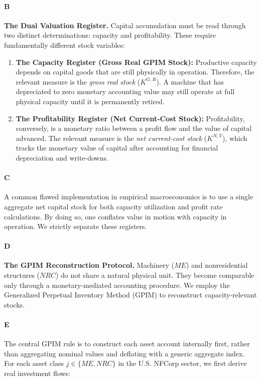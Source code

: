 \paragraph{B}
\textbf{The Dual Valuation Register.} Capital accumulation must be read through two distinct determinations: capacity and profitability. These require fundamentally different stock variables:

\begin{enumerate}
	\item \textbf{The Capacity Register (Gross Real GPIM Stock):} Productive capacity depends on capital goods that are still physically in operation. Therefore, the relevant measure is the \textit{gross real stock} ($K^{G,R}$). A machine that has depreciated to zero monetary accounting value may still operate at full physical capacity until it is permanently retired.
	\item \textbf{The Profitability Register (Net Current-Cost Stock):} Profitability, conversely, is a monetary ratio between a profit flow and the value of capital advanced. The relevant measure is the \textit{net current-cost stock} ($K^{N,V}$), which tracks the monetary value of capital after accounting for financial depreciation and write-downs.
\end{enumerate}

\paragraph{C}
A common flawed implementation in empirical macroeconomics is to use a single aggregate net capital stock for both capacity utilization and profit rate calculations. By doing so, one conflates value in motion with capacity in operation. We strictly separate these registers.

\paragraph{D}
\textbf{The GPIM Reconstruction Protocol.} Machinery ($ME$) and nonresidential structures ($NRC$) do not share a natural physical unit. They become comparable only through a monetary-mediated accounting procedure. We employ the Generalized Perpetual Inventory Method (GPIM) to reconstruct capacity-relevant stocks.

\paragraph{E}
The central GPIM rule is to construct each asset account internally first, rather than aggregating nominal values and deflating with a generic aggregate index. For each asset class $j \in \{ME, NRC\}$ in the U.S. NFCorp sector, we first derive real investment flows:

